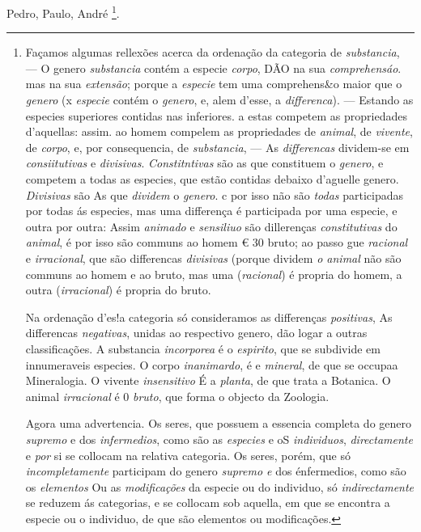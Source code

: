 Pedro, Paulo, André \footnote{Façamos algumas rellexões acerca da ordenação da categoria de \emph{substancia}, --- O genero \emph{substancia} contém a especie \emph{corpo}, DÃO na sua \emph{comprehensáo}. mas na sua \emph{extensão}; porque a \emph{especie} tem uma comprehens\&o maior que o \emph{genero} (x \emph{especie} contém o \emph{genero}, e, alem d'esse, a \emph{differenca}). --- Estando as especies superiores contidas nas inferiores. a estas competem as propriedades d'aquellas: assim. ao homem compelem as propriedades de \emph{animal}, de \emph{vivente}, de \emph{corpo}, e, por consequencia, de \emph{substancia}, --- As \emph{differencas} dividem-se em \emph{consiitutivas} e \emph{divisivas}. \emph{Constitntivas} são as que constituem o \emph{genero}, e competem a todas as especies, que estão contidas debaixo d'aguelle genero. \emph{Divisivas} são As que \emph{dividem} o \emph{genero}. c por isso não são \emph{todas} participadas por todas ás especies, mas uma differença é participada por uma especie, e outra por outra: Assim \emph{animado} e \emph{sensiliuo} são dillerenças \emph{constitutivas} do \emph{animal}, é por isso são communs ao homem € 30 bruto; ao passo gue \emph{racional} e \emph{irracional}, que são differencas \emph{divisivas} (porque dividem \emph{o animal} não são communs ao homem e ao bruto, mas uma (\emph{racional}) é propria do homem, a outra (\emph{irracional}) é propria do bruto.\par Na ordenação d'es!a categoria só consideramos as differenças \emph{positivas}, As differencas \emph{negativas}, unidas ao respectivo genero, dão logar a outras classificações. A substancia \emph{incorporea} é o \emph{espirito}, que se subdivide em innumeraveis especies. O corpo \emph{inanimardo}, é e \emph{mineral}, de que se occupaa Mineralogia. O vivente \emph{insensitivo} É a \emph{planta}, de que trata a Botanica. O animal \emph{irracional} é 0 \emph{bruto}, que forma o objecto da Zoologia.\par Agora uma advertencia. Os seres, que possuem a essencia completa do genero \emph{supremo} e dos \emph{infermedios}, como são as \emph{especies} e oS \emph{individuos}, \emph{directamente} e \emph{por} si se collocam na relativa categoria. Os seres, porém, que só \emph{incompletamente} participam do genero \emph{supremo e} dos énfermedios, como são os \emph{elementos} Ou as \emph{modificações} da especie ou do individuo, só \emph{indirectamente} se reduzem ás categorias, e se collocam sob aquella, em que se encontra a especie ou o individuo, de que são elementos ou modificações.}.

